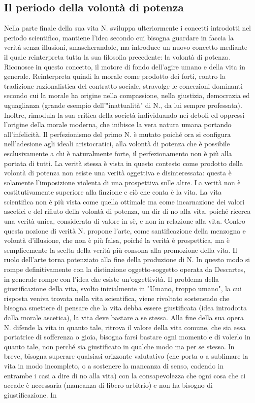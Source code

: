 \documentclass[10pt,a4paper]{article}
\begin{document}
\subsection{Il periodo della volontà di potenza}
Nella parte finale della sua vita N. sviluppa ulteriormente i concetti introdotti nel periodo scientifico, mantiene l'idea secondo cui bisogna guardare in faccia la verità senza illusioni, smascherandole, ma introduce un nuovo concetto mediante il quale reinterpreta tutta la sua filosofia precedente: la volontà di potenza. Riconosce in questo concetto, il motore di fondo dell'agire umano e della vita in generale. Reinterpreta quindi la morale come prodotto dei forti, contro la tradizione razionalistica del contratto sociale, stravolge le concezioni dominanti secondo cui la morale ha origine nella compassione, nella giustizia, democrazia ed uguaglianza (grande esempio dell'"inattualità" di N., da lui sempre professata). Inoltre, rimodula la sua critica della società individuando nei deboli ed oppressi l'origine della morale moderna, che inibisce la vera natura umana portando all'infelicità. Il perfezionismo del primo N. è mutato poiché ora si configura nell'adesione agli ideali aristocratici, alla volontà di potenza che è possibile esclusivamente a chi è naturalmente forte, il perfezionamento non è più alla portata di tutti. La verità stessa è vista in questo contesto come prodotto della volontà di potenza non esiste una verità oggettiva e disinteressata: questa è solamente l'imposizione violenta di una prospettiva sulle altre. La verità non è costitutivamente superiore alla finzione e ciò che conta è la vita. La vita scientifica non è più vista come quella ottimale ma come incarnazione dei valori ascetici e del rifiuto della volontà di potenza, un dir di no alla vita, poiché ricerca una verità unica, considerata di valore in sè, e non in relazione alla vita. Contro questa nozione di verità N. propone l'arte, come santificazione della menzogna e volontà d'illusione, che non è più falsa, poiché la verità è prospettica, ma è semplicemente la scelta della verità più consona alla promozione della vita. Il ruolo dell'arte torna potenziato alla fine della produzione di N. In questo modo si rompe definitivamente con la distinzione oggetto-soggetto operata da Descartes, in generale rompe con l'idea che esiste un'oggettività. Il problema della giustificazione della vita, svolto inizialmente in "Umano, troppo umano", la cui risposta veniva trovata nella vita scientifica, viene rivoltato sostenendo che bisogna smettere di pensare che la vita debba essere giustificata (idea introdotta dalla morale ascetica), la vita deve bastare a se stessa. Alla fine della sua opera N. difende la vita in quanto tale, ritrova il valore della vita comune, che sia essa portatrice di sofferenza o gioia, bisogna farsi bastare ogni momento e di volerlo in quanto tale, non perché sia giustificato in qualche modo ma per se stesso. In breve, bisogna superare qualsiasi orizzonte valutativo (che porta o a sublimare la vita in modo incompleto, o a sostenere la mancanza di senso, cadendo in entrambe i casi a dire di no alla vita) con la consapevolezza che ogni cosa che ci accade è necessaria (mancanza di libero arbitrio) e non ha bisogno di giustificazione. In 
\end{document}
